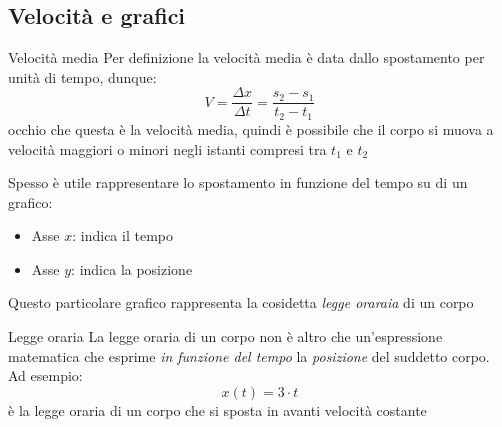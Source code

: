 \subsection{Velocità e grafici}
\begin{definizione}{Velocità media}
	Per definizione la velocità media è data dallo spostamento per unità di tempo, dunque:
	\[
		V = \frac{\Delta x}{\Delta t} = \frac{s_2 - s_1}{t_2 - t_1}
	\]
	occhio che questa è la velocità media, quindi è possibile che il corpo si muova a velocità maggiori o minori negli istanti compresi tra $ t_1 $ e $ t_2 $
\end{definizione}
Spesso è utile rappresentare lo spostamento in funzione del tempo su di un grafico:
\begin{itemize}
	\item Asse $ x $: indica il tempo
	\item Asse $ y $: indica la posizione
\end{itemize}
Questo particolare grafico rappresenta la cosidetta \textit{legge oraraia} di un corpo
\begin{definizione}{Legge oraria}
	La legge oraria di un corpo non è altro che un'espressione matematica che esprime \textit{in funzione del tempo} la \textit{posizione} del suddetto corpo. Ad esempio:
	\[
		x\left(t\right) = 3 \cdot t
	\]
	è la legge oraria di un corpo che si sposta in avanti velocità costante
\end{definizione}
